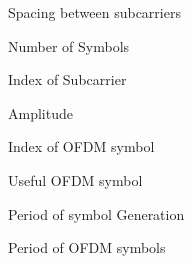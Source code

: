\begin{description}[labelsep=5em, align=left,labelindent=2cm]
\item[$\Delta f$] Spacing between subcarriers
\item[$N$] Number of Symbols
\item[$n$] Index of Subcarrier
\item[$a$] Amplitude
\item[$m$] Index of OFDM symbol
\item[$sm$] Useful OFDM symbol
\item[$T_u$] Period of symbol Generation
\item[$T_s$] Period of OFDM symbols
\end{description}
